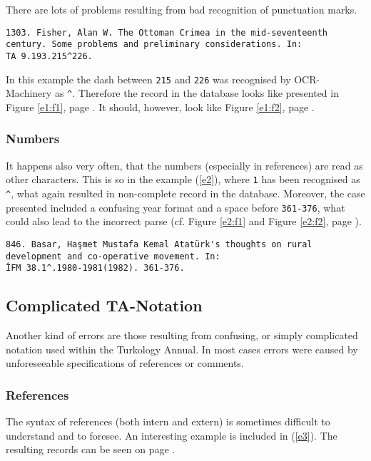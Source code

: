 \documentclass{scrartcl}
\begin{document}
There are lots of problems resulting from bad recognition of punctuation marks. 

\begin{example}
\begin{verbatim}
1303. Fisher, Alan W. The Ottoman Crimea in the mid-seventeenth 
century. Some problems and preliminary considerations. In: 
TA 9.193.215^226.
\end{verbatim}
\label{e1}
\end{example}
 
In this example the dash between \verb+215+ and \verb+226+ was recognised by
OCR-Machinery as \verb+^+. Therefore the record in the database looks like
presented in Figure \ref{e1:f1}, page \pageref{e1:f1}. It should, however, look like
Figure \ref{e1:f2}, page \pageref{e1:f2}.

\subsubsection{Numbers}
It happens also very often, that the numbers (especially in references) are read
as other characters. This is so in the example (\ref{e2}), where \verb+1+ has
been recognised as \verb+^+, what again resulted in non-complete record in the
database. Moreover, the case presented included a confusing year format and a
space before \verb+361-376+, what could also lead to the incorrect parse (cf.
Figure \ref{e2:f1} and Figure \ref{e2:f2}, page \pageref{e2:f1}).

\begin{example}
\begin{verbatim}
846. Basar, Haşmet Mustafa Kemal Atatürk's thoughts on rural 
development and co-operative movement. In:
ÎFM 38.1^.1980-1981(1982). 361-376.
\end{verbatim}
\label{e2}
\end{example}

\subsection{Complicated TA-Notation}
Another kind of errors are those resulting from confusing, or simply complicated
notation used within the Turkology Annual. In most cases errors were caused by
unforeseeable specifications of references or comments. 

\subsubsection{References}
The syntax of references (both intern and extern) is sometimes difficult to
understand and to foresee. An interesting example is included in (\ref{e3}). The
resulting records can be seen on page \pageref{e3:f1}.
\end{document}
